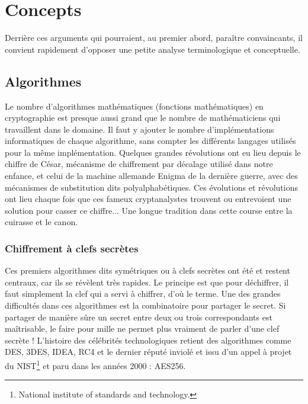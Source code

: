 \section{Concepts}
Derrière ces arguments qui pourraient, au premier abord, paraître convaincants, il convient rapidement d'opposer une petite analyse terminologique et conceptuelle.

\subsection{Algorithmes}

Le nombre d'algorithmes mathématiques
(fonctions mathématiques) en cryptographie est presque aussi grand que le nombre de mathématiciens qui travaillent dans le domaine. Il faut y ajouter le nombre d'implémentations informatiques de chaque algorithme, sans compter les différents langages utilisés pour la même implémentation.
Quelques grandes révolutions ont eu lieu depuis le chiffre de César, mécanisme de chiffrement par décalage
utilisé dans notre enfance, et celui de la machine allemande Enigma de la dernière guerre, avec des mécanismes de substitution dits polyalphabétiques. Ces évolutions et révolutions ont lieu chaque fois que ces fameux cryptanalystes trouvent ou entrevoient une solution pour casser ce chiffre... Une longue tradition dans cette course entre la cuirasse et le canon.


\subsubsection{Chiffrement à clefs secrètes} 
Ces premiers algorithmes dits symétriques ou à clefs secrètes ont été et restent centraux, car ils se révèlent très rapides. Le principe est que pour déchiffrer, il faut simplement la clef qui a servi à chiffrer, d'où le terme.
Une des grandes difficultés dans ces algorithmes est la combinatoire pour partager le secret. Si partager de manière sûre un secret entre deux ou trois correspondants est maîtrisable, le faire pour mille ne permet plus vraiment de parler d'une clef secrète ! L'histoire des célébrités technologiques retient des algorithmes comme DES, 3DES, IDEA, RC4 et le dernier réputé inviolé et issu d'un appel à projet du NIST\footnote{National institute of standards and technology.} et paru dans les années 2000 : AES256.

